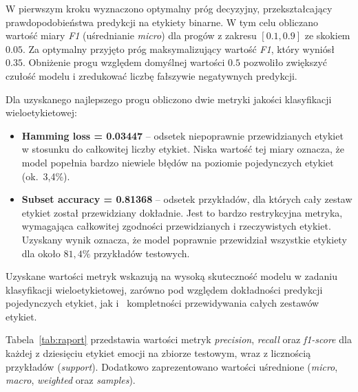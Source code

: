 \documentclass[wmii, inf, mgr]{uwmthesis}
\begin{document}
W pierwszym kroku wyznaczono optymalny próg decyzyjny, przekształcający prawdopodobieństwa predykcji na etykiety binarne. 
W tym celu obliczano wartość miary \textit{F1} (uśrednianie \textit{micro}) dla progów z zakresu \([0.1, 0.9]\) ze skokiem \(0.05\). Za optymalny przyjęto próg maksymalizujący wartość \textit{F1}, który wyniósł \(0.35\). Obniżenie progu względem domyślnej wartości \(0.5\) pozwoliło zwiększyć czułość modelu i zredukować liczbę fałszywie negatywnych predykcji.

Dla uzyskanego najlepszego progu obliczono dwie metryki jakości klasyfikacji wieloetykietowej:

\begin{itemize}
	\item \textbf{Hamming loss = 0.03447} -- odsetek niepoprawnie przewidzianych etykiet w stosunku do całkowitej liczby etykiet. 
	Niska wartość tej miary oznacza, że model popełnia bardzo niewiele błędów na poziomie pojedynczych etykiet (ok.~3,4\%).
	
	\item \textbf{Subset accuracy = 0.81368} -- odsetek przykładów, dla których cały zestaw etykiet został przewidziany dokładnie. Jest to bardzo restrykcyjna metryka, wymagająca całkowitej zgodności przewidzianych i rzeczywistych etykiet. Uzyskany wynik oznacza, że model poprawnie przewidział wszystkie etykiety dla około \(81{,}4\%\) przykładów testowych.
\end{itemize}

Uzyskane wartości metryk wskazują na wysoką skuteczność modelu w zadaniu klasyfikacji wieloetykietowej, zarówno pod względem dokładności predykcji pojedynczych etykiet, jak i~ kompletności przewidywania całych zestawów etykiet.


Tabela~\ref{tab:raport} przedstawia wartości metryk \textit{precision}, \textit{recall} oraz \textit{f1-score} dla każdej z dziesięciu etykiet emocji na zbiorze testowym, wraz z licznością przykładów (\textit{support}). Dodatkowo zaprezentowano wartości uśrednione (\textit{micro}, \textit{macro}, \textit{weighted} oraz \textit{samples}). 
\end{document}
